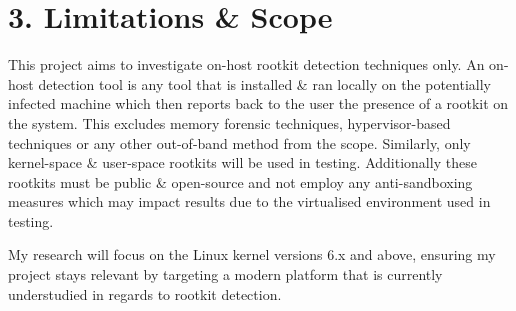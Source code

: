 \documentclass[12pt, a4paper]{article}
\begin{document}
\section*{3. Limitations \& Scope}
This project aims to investigate on-host rootkit detection techniques only. An on-host detection tool is any tool that is installed \& ran locally on the potentially infected machine which then reports back to the user the presence of a rootkit on the system.  This excludes memory forensic techniques, hypervisor-based techniques or any other out-of-band method from the scope.
Similarly, only kernel-space \& user-space rootkits will be used in testing. Additionally these rootkits must be public \& open-source and not employ any anti-sandboxing measures which may impact results due to the virtualised environment used in testing.

My research will focus on the Linux kernel versions 6.x and above, ensuring my project stays relevant by targeting a modern platform that is currently understudied in regards to rootkit detection.
\end{document}
